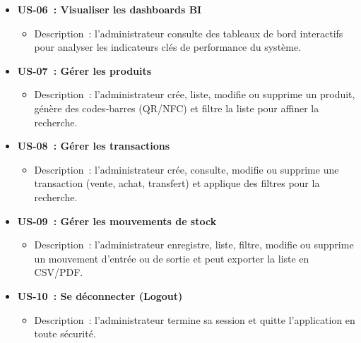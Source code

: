 \documentclass[12pt,a4paper]{report}
\begin{document}
\begin{itemize}
  \item \textbf{US-06 : Visualiser les dashboards BI}  
    \begin{itemize}
      \item Description : l’administrateur consulte des tableaux de bord interactifs pour analyser les indicateurs clés de performance du système.
    \end{itemize}
  \item \textbf{US-07 : Gérer les produits}  
    \begin{itemize}
      \item Description : l’administrateur crée, liste, modifie ou supprime un produit, génère des codes‑barres (QR/NFC) et filtre la liste pour affiner la recherche.
    \end{itemize}
  \item \textbf{US-08 : Gérer les transactions}  
    \begin{itemize}
      \item Description : l’administrateur crée, consulte, modifie ou supprime une transaction (vente, achat, transfert) et applique des filtres pour la recherche.
    \end{itemize}
  \item \textbf{US-09 : Gérer les mouvements de stock}  
    \begin{itemize}
      \item Description : l’administrateur enregistre, liste, filtre, modifie ou supprime un mouvement d’entrée ou de sortie et peut exporter la liste en CSV/PDF.
    \end{itemize}
  \item \textbf{US-10 : Se déconnecter (Logout)}  
    \begin{itemize}
      \item Description : l’administrateur termine sa session et quitte l’application en toute sécurité.
    \end{itemize}
\end{itemize}
\end{document}
